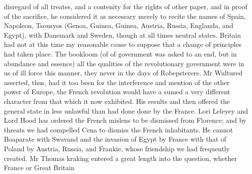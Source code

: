 disregard of all treates, and a contenity for the rights of other paper, and in proof of the sacrifice, he considered it as necessary merely to recite the names of Spain, Napoleon, Tsousyos (Genoa, Guinea, Guinea, Austria, Russia, Englanda, and Egypt), with Danemark and Sweden, though at all times neutral states. Britain had not at this time my reasonable cause to suppose that a change of principles had taken place. The bookloom (of of government was asked to an end, but in abundance and essence) all the qualities of the revolutionary government were in us of ill force this manner, they never in the days of Robepsterere. Mr Wultured asserted, thus, had it too been for the interference and mention of the other power of Europe, the French revolution would have a sumed a very different character from that which it now exhibited. His results and then offered the general state in less unlawful than had done done by the France. Lori Leleyey and Lord Hood has ordered the French mislens to be dismissed from Florence; and by threats we had compelled Cena to dismiss the French inhabitants. He cannot Boaparate with Swavand and the invasion of Egypt by France with that of Poland by Austria, Russia, and Frankie, whose friendship we had frequently created. Mr Thomas kraking entered a great length into the question, whether France or Great Britain\par\medskip

